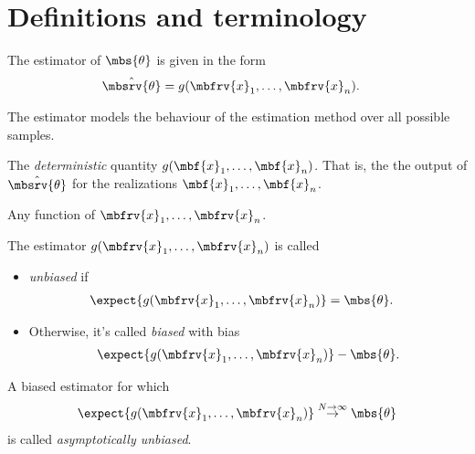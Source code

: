 \section{Definitions and terminology}
\begin{definitionBox}[Estimator]
    The estimator of $\mbs{\theta}$ is given in the form
    \begin{align}
        \hat{\mbsrv{\theta}} &= g(\mbfrv{x}_{1}, \ldots, \mbfrv{x}_{n}).
    \end{align}

    The estimator models the behaviour of the estimation method over all possible samples.
\end{definitionBox}
\begin{definitionBox}
    The \emph{deterministic} quantity $g(\mbf{x}_{1},\ldots,\mbf{x}_{n})$. That is, the the output of $\hat{\mbsrv{\theta}}$ for the realizations $\mbf{x}_{1}, \ldots, \mbf{x}_{n}$.
\end{definitionBox}
\begin{definitionBox}[Statistic]
    Any function of $\mbfrv{x}_{1}, \ldots, \mbfrv{x}_{n}$.
\end{definitionBox}
\begin{definitionBox}[Bias]
    The estimator $g(\mbfrv{x}_{1}, \ldots, \mbfrv{x}_{n})$ is called
    \begin{itemize}
        \item \emph{unbiased} if 
        \begin{align}
            \expect{g(\mbfrv{x}_{1},\ldots, \mbfrv{x}_{n})} &= \mbs{\theta}.
        \end{align}
        \item Otherwise, it's called \emph{biased} with bias
        \begin{align}
            \expect{g(\mbfrv{x}_{1},\ldots, \mbfrv{x}_{n})} - \mbs{\theta}.
        \end{align}
    \end{itemize}
\end{definitionBox}

\begin{definitionBox}
    A biased estimator for which
    \begin{align}
        \expect{g(\mbfrv{x}_{1},\ldots,\mbfrv{x}_{n})} \overset{N\to\infty}{\to} \mbs{\theta}
    \end{align}
    is called \emph{asymptotically unbiased}.
\end{definitionBox}

